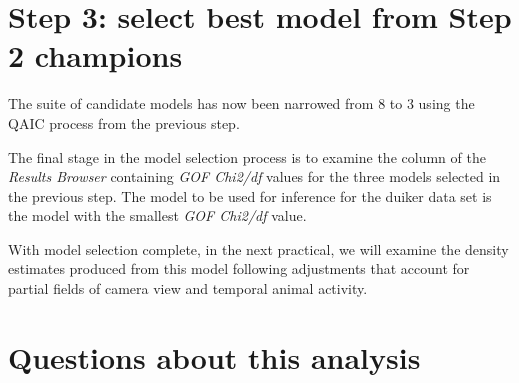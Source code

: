 \documentclass[a4paper, 10pt]{article}
\begin{document}
\section{Step 3: select best model from Step 2 champions}
The suite of candidate models has now been narrowed from 8 to 3 using the QAIC process from the previous step. 

The final stage in the model selection process is to examine the column of the \emph{Results Browser} containing \emph{GOF Chi2/df} values for the three models selected in the previous step.  The model to be used for inference for the duiker data set is the model with the smallest \emph{GOF Chi2/df} value.

With model selection complete, in the next practical, we will examine the density estimates produced from this model following adjustments that account for partial fields of camera view and temporal animal activity.

{
}

\section{Questions about this analysis}
\end{document}
